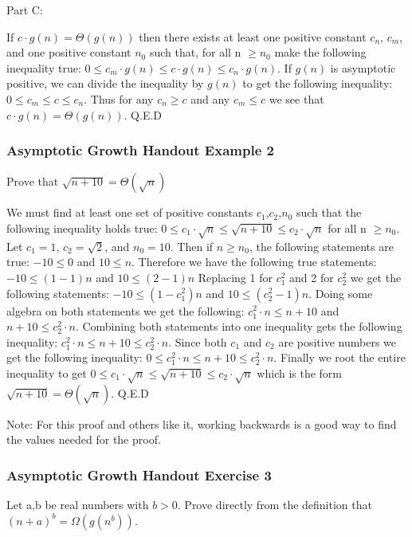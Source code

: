 \documentclass{article}
\begin{document}
Part C:

If $c \cdot g(n) = \Theta(g(n))$ then there exists at least one positive constant $c_n$, $c_m$, and one positive constant $n_0$ such that, for all n $\geq n_0$ make the following inequality true: $0 \leq c_m \cdot g(n) \leq c \cdot g(n) \leq c_n \cdot g(n)$. If $g(n)$ is asymptotic positive, we can divide the inequality by $g(n)$ to get the following inequality: $0 \leq c_m \leq c \leq c_n$. Thus for any $c_n \geq c$ and any $c_m \leq c$ we see that $c \cdot g(n) = \Theta(g(n))$. Q.E.D

\subsubsection{Asymptotic Growth Handout Example 2}

Prove that $\sqrt{n + 10} = \Theta(\sqrt{n})$

We must find at least one set of positive constants $c_1$,$c_2$,$n_0$ such that the following inequality holds true: $0 \leq c_1 \cdot \sqrt{n} \leq \sqrt{n + 10}\leq c_2 \cdot \sqrt{n}$ for all n $\geq n_0$. Let $c_1 = 1$, $c_2 = \sqrt{2}$, and $n_0 = 10$. Then if $n \geq n_0$, the following statements are true: $-10 \leq 0$ and $10 \leq n$. Therefore we have the following true statements: $-10 \leq (1-1)n$ and $10 \leq (2-1)n$ Replacing 1 for $c_1^2$ and 2 for $c_2^2$ we get the following statements: $-10 \leq (1-c_1^2)n$ and $10 \leq (c_2^2 -1)n$. Doing some algebra on both statements we get the following: $c_1^2 \cdot n\leq n + 10$ and $n +10 \leq c_2^2 \cdot n$. Combining both statements into one inequality gets the following inequality: $c_1^2 \cdot n \leq n + 10 \leq c_2^2 \cdot n$. Since both $c_1$ and $c_2$ are positive numbers we get the following inequality: $0 \leq c_1^2 \cdot n \leq n + 10 \leq c_2^2 \cdot n$. Finally we root the entire inequality to get $0 \leq c_1 \cdot \sqrt{n} \leq \sqrt{n + 10} \leq c_2 \cdot \sqrt{n}$ which is the form $\sqrt{n + 10} = \Theta(\sqrt{n})$. Q.E.D

Note: For this proof and others like it, working backwards is a good way to find the values needed for the proof.

\subsubsection{Asymptotic Growth Handout Exercise 3}

Let a,b be real numbers with $b > 0$. Prove directly from the definition that $(n + a)^b = \Omega(g(n^b))$.
\end{document}
